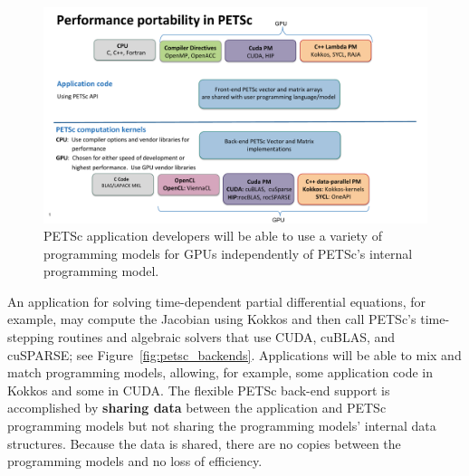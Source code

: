 \documentclass[10pt,journal,compsoc]{IEEEtran}
\begin{document}
\begingroup
\captionsetup[figure]{skip=0pt,belowskip=0pt}
\begin{figure}[H]
\begin{center}
\includegraphics[width=1.0\linewidth]{PETSc-Diagrams_v3.pdf}
\caption{PETSc application developers will be able to use a variety of programming models for GPUs independently of PETSc's internal programming model.}
\label{fig:petsc_accel_support}
\end{center}
\end{figure}
\endgroup
\vskip-10pt

An application for solving time-dependent partial differential
equations, for example, may compute the Jacobian using Kokkos 
and then call PETSc's time-stepping
routines and algebraic solvers that use CUDA, cuBLAS,
and cuSPARSE; see Figure~\ref{fig:petsc_backends}.
Applications will be able to mix and match programming models,
allowing, for example, some application code in Kokkos and some in CUDA. The
flexible PETSc back-end support is accomplished by {\bf sharing data} between the application and PETSc programming models but not
sharing the programming models' internal data structures.
Because the data is shared, there are no copies between the programming models and no loss of efficiency.

\end{document}
